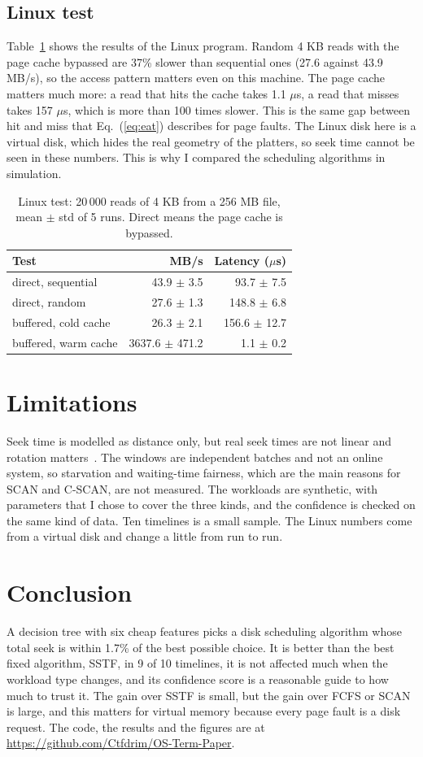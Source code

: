 \documentclass[conference]{IEEEtran}
\begin{document}
\subsection{Linux test}
Table~\ref{tab:linux} shows the results of the Linux program. Random 4 KB reads with the page cache bypassed are 37\% slower than sequential ones (27.6 against 43.9 MB/s), so the access pattern matters even on this machine. The page cache matters much more: a read that hits the cache takes 1.1 $\mu$s, a read that misses takes 157 $\mu$s, which is more than 100 times slower. This is the same gap between hit and miss that Eq.~(\ref{eq:eat}) describes for page faults. The Linux disk here is a virtual disk, which hides the real geometry of the platters, so seek time cannot be seen in these numbers. This is why I compared the scheduling algorithms in simulation.

\begin{table}[t]
\caption{Linux test: 20\,000 reads of 4 KB from a 256 MB file, mean $\pm$ std of 5 runs. Direct means the page cache is bypassed.}
\label{tab:linux}
\centering\small
\begin{tabular}{@{}lrr@{}}
\toprule
Test & MB/s & Latency ($\mu$s) \\
\midrule
direct, sequential & 43.9 $\pm$ 3.5 & 93.7 $\pm$ 7.5 \\
direct, random & 27.6 $\pm$ 1.3 & 148.8 $\pm$ 6.8 \\
buffered, cold cache & 26.3 $\pm$ 2.1 & 156.6 $\pm$ 12.7 \\
buffered, warm cache & 3637.6 $\pm$ 471.2 & 1.1 $\pm$ 0.2 \\
\bottomrule
\end{tabular}
\end{table}

\section{Limitations}
Seek time is modelled as distance only, but real seek times are not linear and rotation matters~\cite{ruemmler94}. The windows are independent batches and not an online system, so starvation and waiting-time fairness, which are the main reasons for SCAN and C-SCAN, are not measured. The workloads are synthetic, with parameters that I chose to cover the three kinds, and the confidence is checked on the same kind of data. Ten timelines is a small sample. The Linux numbers come from a virtual disk and change a little from run to run.

\section{Conclusion}
A decision tree with six cheap features picks a disk scheduling algorithm whose total seek is within 1.7\% of the best possible choice. It is better than the best fixed algorithm, SSTF, in 9 of 10 timelines, it is not affected much when the workload type changes, and its confidence score is a reasonable guide to how much to trust it. The gain over SSTF is small, but the gain over FCFS or SCAN is large, and this matters for virtual memory because every page fault is a disk request. The code, the results and the figures are at \url{https://github.com/Ctfdrim/OS-Term-Paper}.
\end{document}
